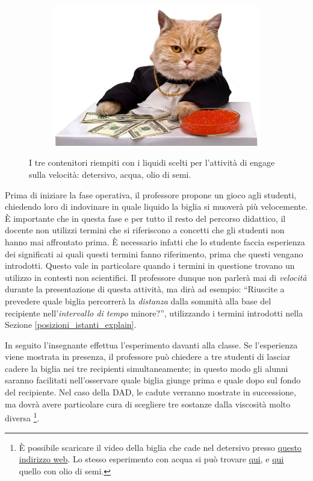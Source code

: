 \documentclass{report} \usepackage[T1]{fontenc} \usepackage[italian]{babel}
\begin{document}
\begin{figure}[H]
\begin{subfigure}[b]{0.5\textwidth}
  \includegraphics[width=\textwidth]{cat_caviar}
  \end{subfigure}
  \caption{
           I tre contenitori riempiti con i liquidi
           scelti per l'attività di engage sulla
           velocità: detersivo, acqua, olio di semi.
          }
  \label{fig:liquids}
\end{figure}
Prima di iniziare la fase operativa, il professore propone un gioco
agli studenti, chiedendo loro di indovinare in quale liquido la biglia
si muoverà più velocemente. \`E importante che in questa fase e per
tutto il resto del percorso didattico, il docente non utilizzi termini
che si riferiscono a concetti che gli studenti non hanno mai
affrontato prima. \`E necessario infatti che lo studente faccia
esperienza dei significati ai quali questi termini fanno riferimento,
prima che questi vengano introdotti. Questo vale in particolare
quando i termini in questione trovano un utilizzo in contesti
non scientifici\cite{arons1997teaching}.
Il professore dunque non parlerà mai di \emph{velocità} durante
la presentazione di questa attività, ma dirà ad esempio:
``Riuscite a prevedere quale biglia percorrerà la \emph{distanza}
dalla sommità alla base del recipiente nell'\emph{intervallo di tempo}
minore?'', utilizzando i termini introdotti nella Sezione
\ref{posizioni_istanti_explain}.

In seguito l'insegnante effettua l'esperimento davanti alla classe.
Se l'esperienza viene mostrata in presenza, il professore
può chiedere a tre studenti di lasciar cadere la biglia nei tre recipienti
simultaneamente; in questo modo gli alunni saranno facilitati
nell'osservare quale biglia giunge prima e quale dopo sul fondo del
recipiente. Nel caso della DAD, le cadute verranno mostrate in successione,
 ma dovrà avere particolare cura di scegliere tre sostanze dalla
viscosità molto diversa
\footnote{
          \`E possibile scaricare il video della biglia che
          cade nel detersivo presso
          \href{https://github.com/savaroskij/PED1/blob/master/progetto_finale/media/video/biglia_detersivo.mp4?raw=true}{questo indirizzo web}.
          Lo stesso esperimento con acqua si può trovare
          \href{http://burymewithmymoney.com/}{qui},
          e
          \href{http://burymewithmymoney.com/}{qui}
          quello con olio di semi.
         }.
\end{document}
